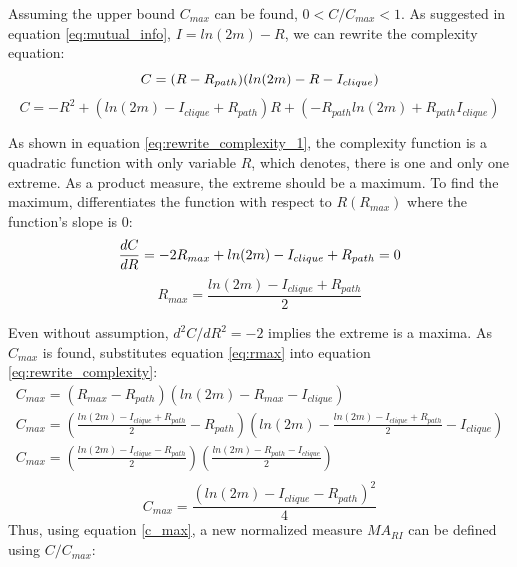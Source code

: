 \documentclass[12pt]{article}
\begin{document}
Assuming the upper bound $C_{max}$ can be found, $0<C/C_{max}<1$. As suggested in equation \ref{eq:mutual_info}, $I = ln(2m)-R$, we can rewrite the complexity equation:\\
\begin{equation}
    \label{eq:rewrite_complexity}
     C = (R-R_{path})(ln(2m)-R-I_{clique})\\
\end{equation}
\begin{equation}
    \label{eq:rewrite_complexity_1}
    C = -R^2+(ln(2m)-I_{clique}+R_{path})R+(-R_{path}ln(2m)+R_{path}I_{clique})
\end{equation}
\par
As shown in equation \ref{eq:rewrite_complexity_1}, the complexity function is a quadratic function with only variable $R$, which denotes, there is one and only one extreme. As a product measure, the extreme should be a maximum. To find the maximum, differentiates the function with respect to $R(R_{max})$ where the function's slope is 0:
\begin{equation}
    \label{eq:mari_diff}
        \frac{dC}{dR} = -2R_{max}+ln(2m)-I_{clique}+R_{path} = 0\\
\end{equation}
\begin{equation}
    \label{eq:rmax}
    R_{max} = \frac{ln(2m)-I_{clique}+R_{path}}{2}
\end{equation}
\par
Even without assumption, $d^2C/dR^2 = -2$ implies the extreme is a maxima. As $C_{max}$ is found, substitutes equation \ref{eq:rmax} into equation \ref{eq:rewrite_complexity}:\\
\begin{equation}
    \begin{gathered}
        C_{max} =(R_{max}-R_{path})(ln(2m)-R_{max}-I_{clique})\\
        C_{max} = (\frac{ln(2m)-I_{clique}+R_{path}}{2}-R_{path})(ln(2m)-\frac{ln(2m)-I_{clique}+R_{path}}{2}-I_{clique})\\
        C_{max} = (\frac{ln(2m)-I_{clique}-R_{path}}{2})(\frac{ln(2m)-R_{path}-I_{clique}}{2})\\
    \end{gathered}
\end{equation}
\begin{equation}
    \label{c_max}
    C_{max} = \frac{(ln(2m)-I_{clique}-R_{path})^2}{4}
\end{equation}
\noindent
Thus, using equation \ref{c_max}, a new normalized measure $MA_{RI}$ can be defined using $C/C_{max}$:\\
\end{document}
